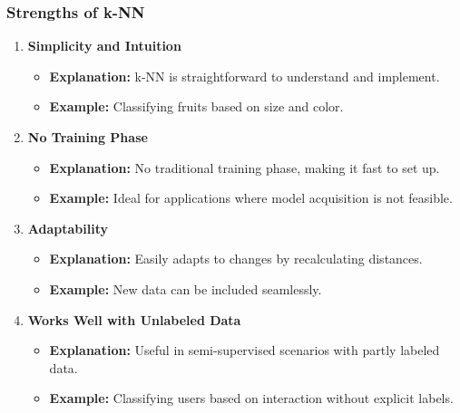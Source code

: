 \documentclass[aspectratio=169]{beamer}
\begin{document}
\begin{frame}[fragile]
    \frametitle{Strengths of k-NN}
    \begin{enumerate}
        \item \textbf{Simplicity and Intuition}
        \begin{itemize}
            \item \textbf{Explanation:} k-NN is straightforward to understand and implement.
            \item \textbf{Example:} Classifying fruits based on size and color.
        \end{itemize}
        
        \item \textbf{No Training Phase}
        \begin{itemize}
            \item \textbf{Explanation:} No traditional training phase, making it fast to set up.
            \item \textbf{Example:} Ideal for applications where model acquisition is not feasible.
        \end{itemize}

        \item \textbf{Adaptability}
        \begin{itemize}
            \item \textbf{Explanation:} Easily adapts to changes by recalculating distances.
            \item \textbf{Example:} New data can be included seamlessly.
        \end{itemize}

        \item \textbf{Works Well with Unlabeled Data}
        \begin{itemize}
            \item \textbf{Explanation:} Useful in semi-supervised scenarios with partly labeled data.
            \item \textbf{Example:} Classifying users based on interaction without explicit labels.
        \end{itemize}
    \end{enumerate}
\end{frame}
\end{document}
